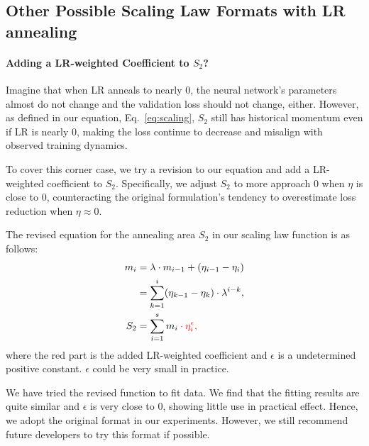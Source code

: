 \subsection{Other Possible Scaling Law Formats with LR annealing}
\label{apx:discsussion-format}
\paragraph{Adding a LR-weighted Coefficient to $S_2$?}
Imagine that when LR anneals to nearly $0$, the neural network's parameters almost do not change and the validation loss should not change, either.
However, as defined in our equation, Eq.~\ref{eq:scaling}, $S_2$ still has historical momentum even if LR is nearly $0$, making the loss continue to decrease and misalign with observed training dynamics.

To cover this corner case, we try a revision to our equation and add a LR-weighted coefficient to $S_2$. Specifically, we adjust $S_2$ to more approach $0$ when $\eta$ is close to $0$, counteracting the original formulation's tendency to overestimate loss reduction when $\eta\approx0$. 


The revised equation for the annealing area \(S_2\) in our scaling law function is as follows:
\begin{equation}
\label{eq:scaling_withlr}
\begin{aligned}
m_i &= \lambda\cdot m_{i-1} + (\eta_{i-1} - \eta_{i}) \\
&= \sum\limits_{k=1}^{i}(\eta_{k-1} - \eta_{k})\cdot \lambda^{i-k}, \\
S_2 &= \sum\limits_{i=1}^{s} m_i \color{red}\cdot \eta_{i}^{\epsilon},
\end{aligned}
\end{equation}
where the red part is the added LR-weighted coefficient and $\epsilon$ is a undetermined positive constant. $\epsilon$ could be very small in practice.

We have tried the revised function to fit data. We find that the fitting results are quite similar and $\epsilon$ is very close to 0, showing little use in practical effect. Hence, we adopt the original format in our experiments. However, we still recommend future developers to try this format if possible.

